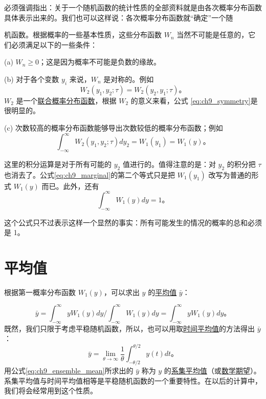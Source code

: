 必须强调指出：关于一个随机函数的统计性质的全部资料就是由各次概率分布函数具体表示出来的。我们也可以这样说：各次概率分布函数就“确定”一个随

机函数。根据概率的一些基本性质，这些分布函数 $ W_n $ 当然不可能是任意的，它们必须满足以下的一些条件：

(a) $ W_n \geq 0 $；这是因为概率不可能是负数的缘故。

(b) 对于各个变数 $ y_i $ 来说，$ W_n $ 是对称的。例如  
\begin{equation}\label{eq:ch9_symmetry}
W_2(y_1, y_2; \tau) = W_2(y_2, y_1; \tau)。
\end{equation}
$ W_2 $ 是一个\underline{联合概率分布函数}，根据 $ W_2 $ 的意义来看，公式 \eqref{eq:ch9_symmetry}是很明显的。

(c) 次数较高的概率分布函数能够导出次数较低的概率分布函数；例如  
\begin{equation}\label{eq:ch9_marginal}
\int_{-\infty}^{\infty} W_2(y_1, y_2; \tau) dy_2 = W_1(y_1) = W_1(y)。
\end{equation}

这里的积分运算是对于所有可能的 $ y_2 $ 值进行的。值得注意的是：对 $ y_2 $ 的积分把 $ \tau $ 也消去了。公式\eqref{eq:ch9_marginal}的第二个等式只是把 $ W_1(y_1) $ 改写为普通的形式 $ W_1(y) $ 而已。此外，还有  
\begin{equation}\label{eq:ch9_normalization}
\int_{-\infty}^{\infty} W_1(y) dy = 1。
\end{equation}

这个公式只不过表示这样一个显然的事实：所有可能发生的情况的概率的总和必须是 1。

\section{平均值}\label{chapter9_section2}

根据第一概率分布函数 $ W_1(y) $，可以求出 $ y $ 的\underline{平均值} $ \bar{y} $：

\begin{equation}\label{eq:ch9_ensemble_mean}
\bar{y} = \int_{-\infty}^{\infty} yW_1(y)dy / \int_{-\infty}^{\infty} W_1(y)dy = \int_{-\infty}^{\infty} yW_1(y)dy。
\end{equation}
既然，我们只限于考虑平稳随机函数，所以，也可以用取\underline{时间平均值}的方法得出 $ \bar{y} $：
\begin{equation}\label{eq:ch9_time_mean_y}
\bar{y} = \lim_{\theta \to \infty} \frac{1}{\theta} \int_{-\theta/2}^{\theta/2} y(t)dt。
\end{equation}
用公式\eqref{eq:ch9_ensemble_mean}所求出的 $ \bar{y} $ 称为 $ y $ 的\underline{系集平均值}（或\underline{数学期望}）。系集平均值与时间平均值相等是平稳随机函数的一个重要特性。在以后的计算中，我们将会经常用到这个性质。


